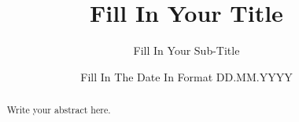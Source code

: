 \documentclass[ds]{mscthesis}
\title{Fill In Your Title}
\subtitle{Fill In Your Sub-Title}
\date{Fill In The Date In Format DD.MM.YYYY}
\affiliation{
  \institution{\thesisinstitution}
  \city{\thesiscity}
  \country{\thesiscountry}
}
\begin{document}
\pagestyle{plain}
\setcounter{page}{0}

\maketitlepage
\fixemptypage

\begin{abstract}
Write your abstract here.
\end{abstract}

\maketitle













\newpage

\end{document}
